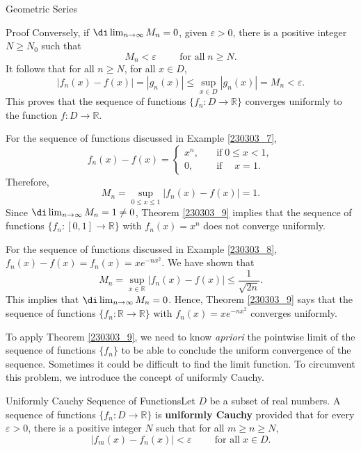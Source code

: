 \begin{example}[label=230305_16]{Geometric Series}
\begin{myproof}{Proof}
Conversely, if $\di\lim_{n\to\infty}M_n=0$, given $\varepsilon>0$, there is a positive integer $N\geq N_0$ such that 
\[M_n<\varepsilon\hspace{1cm}\text{for all}\;n\geq N.\]
It follows that for all $n\geq N$, for all $x\in D$,
\[|f_n(x)-f(x)|=|g_n(x)|\leq\sup_{x\in D}|g_n(x)|=M_n<\varepsilon.\]
This proves that the    sequence of functions $\{f_n:D\to\mathbb{R}\}$  converges uniformly to the function $f:D\to\mathbb{R}$.
\end{myproof}
\begin{example}{}
For  the sequence of functions discussed in Example \ref{230303_7}, \[f_n(x)-f(x)=\begin{cases}x^n,\quad &\text{if}\;0\leq x<1,\\0,\quad &\text{if}\;\quad x=1.\end{cases}\]Therefore,
\[M_n=\sup_{0\leq x\leq 1}|f_n(x)-f(x)|= 1.\]
Since $\di\lim_{n\to\infty}M_n=1\neq 0$,  Theorem \ref{230303_9} implies that the sequence of functions $\{f_n:[0,1]\to\mathbb{R}\}$ with $f_n(x)=x^n$ does not converge uniformly.
\end{example}

\begin{example}{}
For  the sequence of functions discussed in Example \ref{230303_8}, $f_n(x)-f(x)=f_n(x)=xe^{-nx^2}$. We have shown that
\[M_n=\sup_{x\in\mathbb{R}}|f_n(x)-f(x)|\leq\frac{ 1}{\sqrt{2n}}.\]
This implies that $\di\lim_{n\to\infty}M_n= 0$. Hence,  Theorem \ref{230303_9}  says that the sequence of functions $\{f_n:\mathbb{R}\to\mathbb{R}\}$ with $f_n(x)=xe^{-nx^2}$   converges uniformly.
\end{example}

To apply Theorem \ref{230303_9}, we need to know \emph{apriori} the pointwise limit of the sequence of functions $\{f_n\}$ to be able to conclude the uniform convergence of the sequence. Sometimes it could be difficult to find the limit function. To circumvent this problem, we introduce the concept of uniformly Cauchy.

\begin{definition}
{Uniformly Cauchy Sequence of Functions}Let $D$ be a subset of real numbers.
A sequence of functions $\{f_n:D\to\mathbb{R}\}$ is {\bf uniformly Cauchy} provided that for every $\varepsilon>0$, there is a positive integer $N$ such that for all $m\geq n\geq N$,
\[|f_m(x)-f_n(x)|<\varepsilon\hspace{1cm}\text{for all}\;x\in D.\]


\end{definition}
\end{example}
